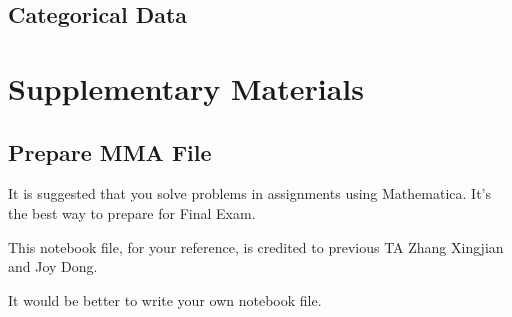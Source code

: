 \documentclass{beamer}
\begin{document}
\subsection{Categorical Data}

\section{Supplementary Materials}
\subsection{Prepare MMA File}
\begin{frame}
It is suggested that you solve problems in assignments using Mathematica. It's the best way to prepare for Final Exam.

This notebook file, for your reference, is credited to previous TA Zhang Xingjian and Joy Dong. 

It would be better to write your own notebook file.
\end{frame}
\end{document}
